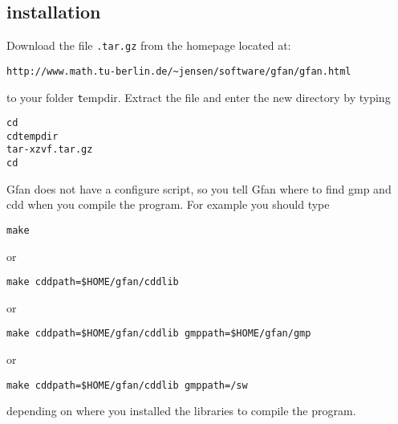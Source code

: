\subsection{\name installation}
\label{subsec:installation}
\color{red}
Download the file {\tt \nameversion .tar.gz} from the \name
homepage located at:
\begin{verbatim}
http://www.math.tu-berlin.de/~jensen/software/gfan/gfan.html
\end{verbatim}
to your folder {\texttt tempdir}.
\noindent
Extract the file and enter the new directory by typing
\begin{alltt}
cd ~
cd tempdir
tar -xzvf \nameversion.tar.gz
cd \nameversion
\end{alltt}
\color{black}
Gfan does not have a configure script, so you tell Gfan where to find gmp and cdd when you compile the program. For example you should type
\begin{verbatim}
make
\end{verbatim}
or

\color{red}
\begin{verbatim}
make cddpath=$HOME/gfan/cddlib
\end{verbatim}
\color{black}
or
\begin{verbatim}
make cddpath=$HOME/gfan/cddlib gmppath=$HOME/gfan/gmp
\end{verbatim}
or
\begin{verbatim}
make cddpath=$HOME/gfan/cddlib gmppath=/sw
\end{verbatim}
depending on where you installed the libraries to compile the program.

